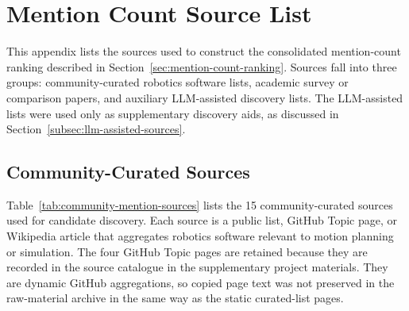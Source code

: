 \chapter{Mention Count Source List}
\label{appendix:mention-count-source-list}

This appendix lists the sources used to construct the consolidated mention-count ranking described in Section~\ref{sec:mention-count-ranking}. Sources fall into three groups: community-curated robotics software lists, academic survey or comparison papers, and auxiliary LLM-assisted discovery lists. The LLM-assisted lists were used only as supplementary discovery aids, as discussed in Section~\ref{subsec:llm-assisted-sources}.

\section*{Community-Curated Sources}

Table~\ref{tab:community-mention-sources} lists the 15 community-curated sources used for candidate discovery. Each source is a public list, GitHub Topic page, or Wikipedia article that aggregates robotics software relevant to motion planning or simulation.
The four GitHub Topic pages are retained because they are recorded in the source catalogue in the supplementary project materials. They are dynamic GitHub aggregations, so copied page text was not preserved in the raw-material archive in the same way as the static curated-list pages.

